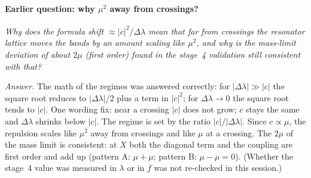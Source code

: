 \paragraph{Earlier question: why $\mu^2$ away from crossings?} \emph{Why does
the formula shift $\approx |c|^2/\Delta\lambda$ mean that far from crossings
the resonator lattice moves the bands by an amount scaling like $\mu^2$, and
why is the mass-limit deviation of about $2\mu$ (first order) found in the
stage~4 validation still consistent with that?}

\emph{Answer.} The math of the regimes was answered correctly: for
$|\Delta\lambda| \gg |c|$ the square root reduces to $|\Delta\lambda|/2$ plus
a term in $|c|^2$; for $\Delta\lambda \to 0$ the square root tends to $|c|$.
One wording fix: near a crossing $|c|$ does not grow; $c$ stays the same and
$\Delta\lambda$ shrinks below $|c|$. The regime is set by the ratio
$|c|/|\Delta\lambda|$. Since $c \propto \mu$, the repulsion scales like
$\mu^2$ away from crossings and like $\mu$ at a crossing. The $2\mu$ of the
mass limit is consistent: at $X$ both the diagonal term and the coupling are
first order and add up (pattern A: $\mu + \mu$; pattern B: $\mu - \mu = 0$).
(Whether the stage~4 value was measured in $\lambda$ or in $f$ was not
re-checked in this session.)
